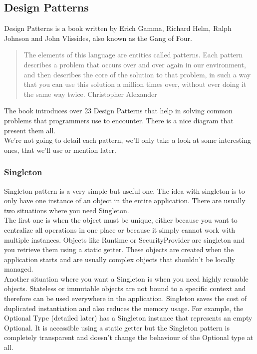 \subsection{Design Patterns}\label{subsec:design-patterns}
Design Patterns is a book written by Erich Gamma,
Richard Helm, Ralph Johnson and John Vlissides, also known as the
Gang of Four.
\begin{quotation}
    The elements of this language are entities called patterns.
    Each pattern describes a problem that occurs over and over again
    in our environment, and then describes the core of the solution to
    that problem, in such a way that you can use this solution a million
    times over, without ever doing it the same way twice.
    \textemdash Christopher Alexander
\end{quotation}
The book introduces over 23 Design Patterns that help in solving common
problems that programmers use to encounter.
There is a nice diagram that present them all.
\\
\newline
We're not going to detail each pattern, we'll only take a look at some
interesting ones, that we'll use or mention later.

\subsubsection{Singleton}
Singleton pattern is a very simple but useful one.
The idea with singleton is to only have one instance of an object in the
entire application.
There are usually two situations where you need Singleton. \\
\newline
The first one is when the object must be unique, either because you want
to centralize all operations in one place or because it simply cannot
work with multiple instances.
Objects like Runtime or SecurityProvider are singleton and you retrieve
them using a static getter.
These objects are created when the application starts and are usually
complex objects that shouldn't be locally managed. \\
\newline
Another situation where you want a Singleton is when you need highly
reusable objects.
Stateless or immutable objects are not bound to a specific context and
therefore can be used everywhere in the application.
Singleton saves the cost of duplicated instantiation and also reduces the
memory usage.
For example, the Optional Type (detailed later) has a Singleton instance
that represents an empty Optional.
It is accessible using a static getter but the Singleton pattern is
completely transparent and doesn't change the behaviour of the Optional
type at all.

